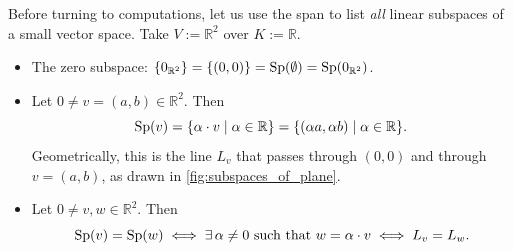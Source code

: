 Before turning to computations, let us use the span to list \emph{all} linear subspaces of a small vector space. Take $V := \mathbb{R}^2$ over $K := \mathbb{R}$.

\begin{example}
\label{ex:lines_through_origin}
\begin{itemize}
    \item The zero subspace: $\{0_{\mathbb{R}^2}\} = \{(0,0)\} = \operatorname{Sp}(\emptyset) = \operatorname{Sp}(0_{\mathbb{R}^2})$.
    \item Let $0 \ne v = (a,b) \in \mathbb{R}^2$. Then
    \[
    \operatorname{Sp}(v) = \{\alpha \cdot v \mid \alpha \in \mathbb{R}\} = \{(\alpha a, \alpha b) \mid \alpha \in \mathbb{R}\}.
    \]
    Geometrically, this is the line $L_v$ that passes through $(0,0)$ and through $v = (a,b)$, as drawn in \cref{fig:subspaces_of_plane}.
    \item Let $0 \ne v, w \in \mathbb{R}^2$. Then
    \[
    \operatorname{Sp}(v) = \operatorname{Sp}(w)
    \iff \exists \, \alpha \ne 0 \text{ such that } w = \alpha \cdot v
    \iff L_v = L_w.
    \]
\end{itemize}
\end{example}

